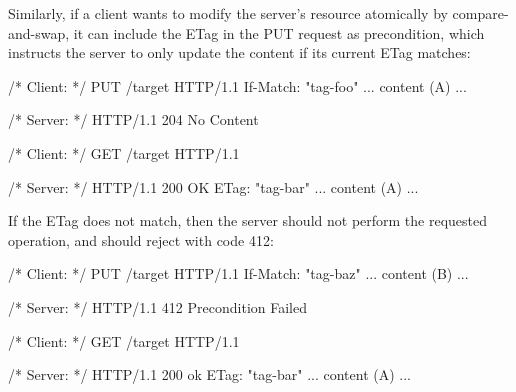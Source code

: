 Similarly, if a client wants to modify the server's resource atomically by
compare-and-swap, it can include the ETag in the PUT request as
 precondition, which instructs the server to only update the
content if its current ETag matches:
\begin{center}
  \begin{minipage}[t]{.4\textwidth}
    \begin{cpp}
/* Client: */
PUT /target HTTP/1.1
If-Match: "tag-foo"
... content (A) ...
    \end{cpp}
  \end{minipage}
  \begin{minipage}[t]{.4\textwidth}
    \begin{cpp}
/* Server: */
HTTP/1.1 204 No Content
    \end{cpp}
  \end{minipage}

  \begin{minipage}[t]{.4\textwidth}
    \begin{cpp}
/* Client: */
GET /target HTTP/1.1
    \end{cpp}
  \end{minipage}
  \begin{minipage}[t]{.4\textwidth}
    \begin{cpp}
/* Server: */
HTTP/1.1 200 OK
ETag: "tag-bar"
... content (A) ...
    \end{cpp}
  \end{minipage}
\end{center}
If the ETag does not match, then the server should not perform the requested
operation, and should reject with code 412:
\begin{center}
  \begin{minipage}[t]{.4\textwidth}
    \begin{cpp}
/* Client: */
PUT /target HTTP/1.1
If-Match: "tag-baz"
... content (B) ...
    \end{cpp}
  \end{minipage}
  \begin{minipage}[t]{.4\textwidth}
    \begin{cpp}
/* Server: */
HTTP/1.1 412 Precondition Failed
    \end{cpp}
  \end{minipage}

  \begin{minipage}[t]{.4\textwidth}
    \begin{cpp}
/* Client: */
GET /target HTTP/1.1
    \end{cpp}
  \end{minipage}
  \begin{minipage}[t]{.4\textwidth}
    \begin{cpp}
/* Server: */
HTTP/1.1 200 ok
ETag: "tag-bar"
... content (A) ...
    \end{cpp}
  \end{minipage}
\end{center}
